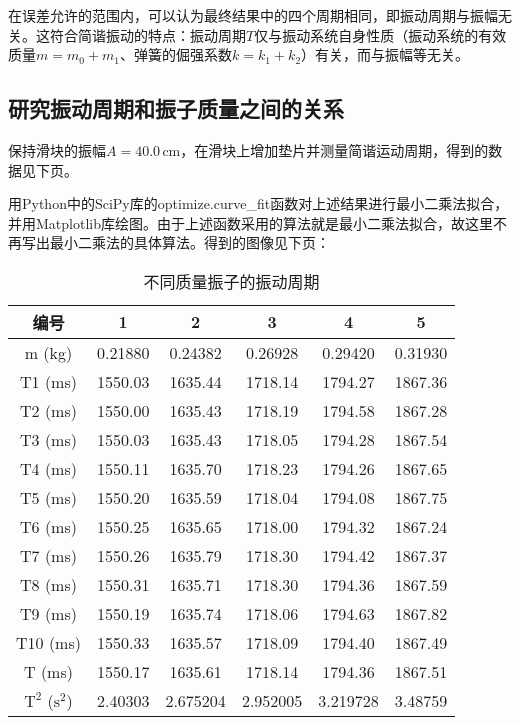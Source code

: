 \documentclass[12pt]{article}
\begin{document}
在误差允许的范围内，可以认为最终结果中的四个周期相同，即振动周期与振幅无关。这符合简谐振动的特点：振动周期$ T $仅与振动系统自身性质（振动系统的有效质量$m=m_0+m_1$、弹簧的倔强系数$k=k_1+k_2$）有关，而与振幅等无关。

\subsection{研究振动周期和振子质量之间的关系}

保持滑块的振幅$A=40.0\,\mathrm{cm}$，在滑块上增加垫片并测量简谐运动周期，得到的数据见下页。

用Python中的SciPy库的optimize.curve_fit函数对上述结果进行最小二乘法拟合，并用Matplotlib库绘图。由于上述函数采用的算法就是最小二乘法拟合，故这里不再写出最小二乘法的具体算法。得到的图像见下页：

\newpage
\begin{table}[htbp]
    \centering
    \begin{tabular}{|c|c|c|c|c|c|}
    \hline
    编号   & 1    & 2    & 3    & 4    & 5 \\
    \hline
    m (kg) & 0.21880  & 0.24382  & 0.26928  & 0.29420  & 0.31930  \\
    \hline
    T1 (ms) & 1550.03  & 1635.44  & 1718.14  & 1794.27  & 1867.36  \\
    \hline
    T2 (ms) & 1550.00  & 1635.43  & 1718.19  & 1794.58  & 1867.28  \\
    \hline
    T3 (ms) & 1550.03  & 1635.43  & 1718.05  & 1794.28  & 1867.54  \\
    \hline
    T4 (ms) & 1550.11  & 1635.70  & 1718.23  & 1794.26  & 1867.65  \\
    \hline
    T5 (ms) & 1550.20  & 1635.59  & 1718.04  & 1794.08  & 1867.75  \\
    \hline
    T6 (ms) & 1550.25  & 1635.65  & 1718.00  & 1794.32  & 1867.24  \\
    \hline
    T7 (ms) & 1550.26  & 1635.79  & 1718.30  & 1794.42  & 1867.37  \\
    \hline
    T8 (ms) & 1550.31  & 1635.71  & 1718.30  & 1794.36  & 1867.59  \\
    \hline
    T9 (ms) & 1550.19  & 1635.74  & 1718.06  & 1794.63  & 1867.82  \\
    \hline
    T10 (ms) & 1550.33  & 1635.57  & 1718.09  & 1794.40  & 1867.49  \\
    \hline
    T (ms) & 1550.17  & 1635.61  & 1718.14  & 1794.36  & 1867.51  \\
    \hline
    $\mathrm{T}^2$ ($\mathrm{s}^2$) & 2.40303 & 2.675204 & 2.952005 & 3.219728 & 3.48759 \\
    \hline
    \end{tabular}
    \caption{不同质量振子的振动周期}
\end{table}%
\end{document}
